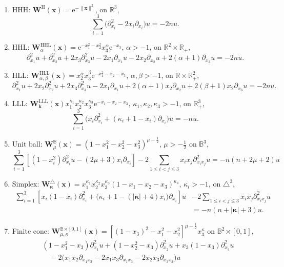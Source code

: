 \documentclass{amsart}
\theoremstyle{remark}
\def\la{{\langle}}
\def\ra{{\rangle}}
\def\e{\mathrm{e}}
\def\a{{\alpha}}
\def\b{{\beta}}
\def\k{{\kappa}}
\def\la{{\langle}}
\def\ra{{\rangle}}
\def\kb{{\bm k}}
\def\xb{{\bm x}}
\def\Wb{{\bm W}}
\def\BB{{\mathbb B}}
\def\RR{{\mathbb R}}
\def\bk{{\boldsymbol{\kappa}}}
\def\f{\frac}
\begin{document}
\begin{enumerate}[   ]
\item[] HHH: $\Wb^\mathrm{H}(\xb) = \e^{- \|\xb\|^2}$, on $\RR^3$,
$$
      \sum_{i=1}^3 \big(\partial_{x_i}^2 - 2 x_i \partial_{x_i} \big) u = - 2n u.
$$
\item[] HHL: $\Wb_\a^\mathrm{HHL}(\xb) = \e^{- x_1^2 -x_2^2} x_3^\a \e^{-x_3}$, $\a > -1$, on $\RR^2 \times \RR_+$,
$$
    \partial_{x_1}^2 u + \partial_{x_2}^2 u + 2 x_3 \partial_{x_3}^2 u - 2 x_1 \partial_{x_1} u
        - 2 x_2 \partial_{x_2} u  + 2 (\a+1) \partial_{x_3}  u = - 2 n u. 
$$
\item[] HLL: $\Wb_{\a,\b}^\mathrm{HLL}(\xb) = x_2^\a x_3^\b \e^{- x_1^2 -x_2-x_3}$, $\a,\b> -1$, on $\RR \times \RR_+^2$,
$$
    \partial_{x_1}^2 u + 2 x_2 \partial_{x_2}^2 u + 2 x_3 \partial_{x_3}^2 u - 2 x_1 \partial_{x_1} u+
          2 (\a+1) x_2 \partial_{x_2} u + 2(\b+1) x_2 \partial_{x_3} u  = - 2 n u.
$$
\item[]LLL:  $\Wb_\kb^\mathrm{LLL}(\xb) x_1^{\k_1} x_2^{\k_2} x_3^{\k_3} \e^{-x_1-x_2 -x_3}$, $\k_1, \k_2, \k_3  > -1$, on $\RR_+^3$,
$$
    \sum_{i=1}^3 \big ( x_i \partial_{x_i}^2 + (\k_i+1 - x_i)  \partial_{x_i} \big ) u = - n u.
$$
\item Unit ball:  $\Wb_\mu^\BB(\xb) = (1-x_1^2-x_2^2-x_3^2)^{\mu-\f12}$, $\mu > -\f12$ on $\BB^3$,
$$
   \sum_{i=1}^3 \left[ (1-x_i^2) \partial_{x_i}^2 u - (2\mu+3) x_i \partial_{x_i} \right] -2 \sum_{1\le i<j \le 3} x_i x_j \partial_{x_i x_j}^2 u   
 = - n(n+2\mu+2) u
$$
\item Simplex:  $\Wb_\bk^\triangle(\xb) = x_1^{\k_1} x_2^{\k_2} x_3^{\k_3} (1-x_1-x_2-x_3)^{\k_4}$, $\k_i > -1$, on $\triangle^3$,
\begin{align*}
   \sum_{i=1}^3  \left[ x_i (1-x_i) \partial_{x_i}^2 +\big(\k_i +1 - (|\bk| +4) x_i\big) \partial_{x_i} \right]u 
     &  -2 \sum_{1\le i<j \le 3} x_i x_j \partial_{x_i x_j}^2 u   \\
   &  = - n(n+|\bk| +3) u.
\end{align*}
\item Finite cone:  $\Wb_{\mu,\k}^{\BB\rtimes[0,1]}(\xb) = \left[(1- x_3)^2- x_1^2-x_2^2\right]^{\mu-\f12} x_3^{\k}$ on $\BB^2 \rtimes [0,1]$,
\begin{align*}
 & (1-x_1^2- x_3) \partial_{x_1}^2 u +  (1-x_2^2- x_3)\partial_{x_2}^2 u + x_3(1-x_3)\partial_{x_3}^2 u \\
 &\quad  - 2 \big(x_1 x_2 \partial_{x_1 x_2}   - 2 x_1 x_3 \partial_{x_1 x_3} 
   - 2 x_2 x_3 \partial_{x_3 x_2} \big) u 

\end{align*}
\end{enumerate}
\end{document}

